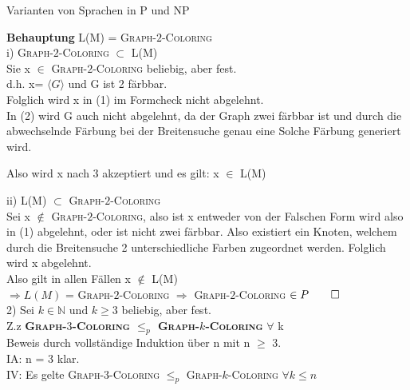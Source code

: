 \documentclass[answers]{submit}
\begin{document}
\begin{exercise}[7]{Varianten von Sprachen in P und NP}
{    \textbf{Behauptung} L(M) = \textsc{Graph-$2$-Coloring} \\

    i) \textsc{Graph-$2$-Coloring} $\subset$ L(M) \\

    Sie x $\in$ \textsc{Graph-$2$-Coloring} beliebig, aber fest. \\

    d.h. x= $\langle G \rangle$ und G ist 2 färbbar. \\

    Folglich wird x in (1) im Formcheck nicht abgelehnt. \\

    In (2) wird G auch nicht abgelehnt, da der Graph zwei färbbar ist und durch die abwechselnde Färbung bei der Breitensuche genau eine Solche Färbung generiert wird.

    Also wird x nach 3 akzeptiert und es gilt: x $\in$ L(M)

    ii) L(M) $\subset$ \textsc{Graph-$2$-Coloring} \\

    Sei x $\notin$ \textsc{Graph-$2$-Coloring}, also ist x entweder von der Falschen Form wird also in (1) abgelehnt, oder ist nicht zwei färbbar. Also existiert ein Knoten, welchem durch die Breitensuche 2 unterschiedliche Farben zugeordnet werden. Folglich wird x abgelehnt. \\

    Also gilt in allen Fällen x $\notin$ L(M) \\

    $\Rightarrow L(M) $ = \textsc{Graph-$2$-Coloring} $ \Rightarrow $
    \textsc{Graph-$2$-Coloring} $\in P \qed $ \\

    2) Sei $ k \in \mathbb{N} \text{ und }  k \geq 3$ beliebig, aber fest. \\

    Z.z \textbf{ \textsc{Graph-$3$-Coloring} $\leq_p$ \textsc{Graph-$k$-Coloring}} $\forall$ k \\

    Beweis durch vollständige Induktion über n mit n $\geq$ 3. \\

    IA: n = 3 klar. \\

    IV: Es gelte \textsc{Graph-$3$-Coloring} $\leq_p$ \textsc{Graph-$k$-Coloring} $\forall k \leq n$ \\

}
\end{exercise}
\end{document}
